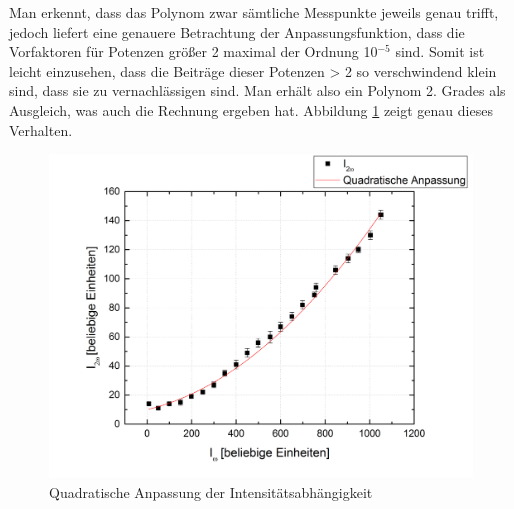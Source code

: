 Man erkennt, dass das Polynom zwar sämtliche Messpunkte jeweils genau trifft, jedoch liefert eine genauere Betrachtung der Anpassungsfunktion, dass die Vorfaktoren für Potenzen größer 2 maximal der Ordnung 10$^{-5}$ sind. Somit ist leicht einzusehen, dass die Beiträge dieser Potenzen > 2 so verschwindend klein sind, dass sie zu vernachlässigen sind. Man erhält also ein Polynom 2. Grades als Ausgleich, was auch die Rechnung ergeben hat. Abbildung \ref{pol2} zeigt genau dieses Verhalten.
\begin{figure}[H]
	\begin{center}
		\includegraphics[scale=.5]{Bilder/IntPol2.png}
		\caption{Quadratische Anpassung der Intensitätsabhängigkeit}
		\label{pol2}
	\end{center}
\end{figure}

